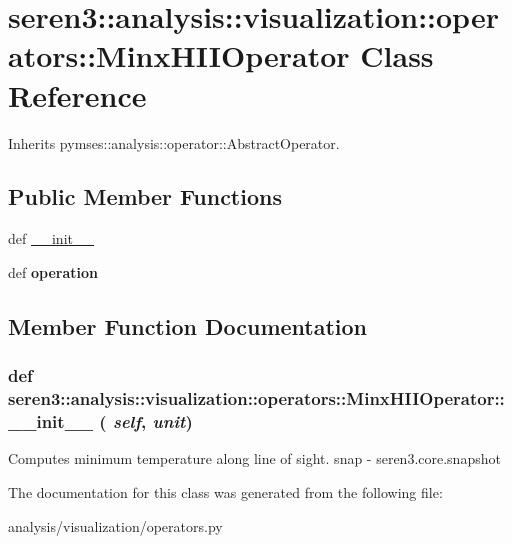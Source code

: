 \hypertarget{classseren3_1_1analysis_1_1visualization_1_1operators_1_1MinxHIIOperator}{
\section{seren3::analysis::visualization::operators::MinxHIIOperator Class Reference}
\label{classseren3_1_1analysis_1_1visualization_1_1operators_1_1MinxHIIOperator}
}


Inherits pymses::analysis::operator::AbstractOperator.\subsection*{Public Member Functions}
\begin{DoxyCompactItemize}
\item 
def \hyperlink{classseren3_1_1analysis_1_1visualization_1_1operators_1_1MinxHIIOperator_a17e6290aa9714866fd9d6c8734fe3b46}{\_\-\_\-init\_\-\_\-}
\item 
\hypertarget{classseren3_1_1analysis_1_1visualization_1_1operators_1_1MinxHIIOperator_af0064a282c8e52ae69e81fe35f5789e5}{
def {\bfseries operation}}
\label{classseren3_1_1analysis_1_1visualization_1_1operators_1_1MinxHIIOperator_af0064a282c8e52ae69e81fe35f5789e5}

\end{DoxyCompactItemize}


\subsection{Member Function Documentation}
\hypertarget{classseren3_1_1analysis_1_1visualization_1_1operators_1_1MinxHIIOperator_a17e6290aa9714866fd9d6c8734fe3b46}{
\subsubsection[{\_\-\_\-init\_\-\_\-}]{\setlength{\rightskip}{0pt plus 5cm}def seren3::analysis::visualization::operators::MinxHIIOperator::\_\-\_\-init\_\-\_\- ( {\em self}, \/   {\em unit})}}
\label{classseren3_1_1analysis_1_1visualization_1_1operators_1_1MinxHIIOperator_a17e6290aa9714866fd9d6c8734fe3b46}
\begin{DoxyVerb}
Computes minimum temperature along line of sight.
snap - seren3.core.snapshot
\end{DoxyVerb}
 

The documentation for this class was generated from the following file:\begin{DoxyCompactItemize}
\item 
analysis/visualization/operators.py\end{DoxyCompactItemize}
